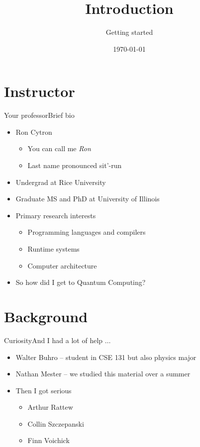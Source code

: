 
\title{Introduction}
\subtitle{Getting started}

\date{\today}

\begin{frame}
\maketitle
\end{frame}
\section{Instructor}
\begin{frame}{Your professor}{Brief bio}
\begin{itemize}
    \item Ron Cytron
    \begin{itemize}
        \item You can call me \emph{Ron}
        \item Last name pronounced sit'-run
    \end{itemize}
    \item Undergrad at Rice University
    \item Graduate MS and PhD at University of Illinois
    \item Primary research interests
    \begin{itemize}
        \item Programming languages and compilers
        \item Runtime systems
        \item Computer architecture
    \end{itemize}
    \item So how did I get to Quantum Computing?
\end{itemize}
    
\end{frame}

\section{Background}
\begin{frame}{Curiosity}{And I had a lot of help $\ldots$}
\begin{itemize}
    \item Walter Buhro -- student in CSE 131 but also physics major
    \item Nathan Mester -- we studied this material over a summer
    \item Then I got serious
    \begin{itemize}
        \item Arthur Rattew
        \item Collin Szczepanski
        \item Finn Voichick
    \end{itemize}
\end{itemize}
    
\end{frame}


